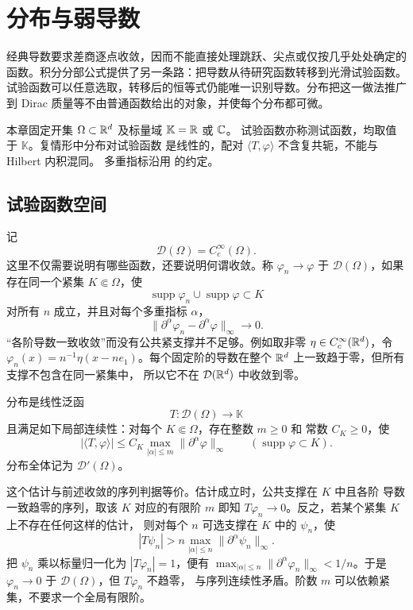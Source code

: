 \chapter{分布与弱导数}
\label{chap:distributions-weak-derivatives}

经典导数要求差商逐点收敛，因而不能直接处理跳跃、尖点或仅按几乎处处确定的
函数。积分分部公式提供了另一条路：把导数从待研究函数转移到光滑试验函数。
试验函数可以任意选取，转移后的恒等式仍能唯一识别导数。分布把这一做法推广
到 Dirac 质量等不由普通函数给出的对象，并使每个分布都可微。

本章固定开集 \(\Omega\subset\mathbb{R}^d\) 及标量域 \(\mathbb K=\mathbb{R}\) 或 \(\mathbb{C}\)。
试验函数亦称测试函数，均取值于 \(\mathbb K\)。复情形中分布对试验函数
是线性的，配对 \(\langle T,\varphi\rangle\) 不含复共轭，不能与 Hilbert 内积混同。
多重指标沿用
的约定。

\section{试验函数空间}

记
\[
 \mathcal D(\Omega)=C_c^\infty(\Omega).
\]
这里不仅需要说明有哪些函数，还要说明何谓收敛。称
\(\varphi_n\to\varphi\) 于 \(\mathcal D(\Omega)\)，如果存在同一个紧集
\(K\Subset\Omega\)，使
\[
 \operatorname{supp}\varphi_n\cup\operatorname{supp}\varphi\subset K
\]
对所有 \(n\) 成立，并且对每个多重指标 \(\alpha\)，
\[
 \|\partial^\alpha\varphi_n-\partial^\alpha\varphi\|_\infty\to0.
\]
“各阶导数一致收敛”而没有公共紧支撑并不足够。例如取非零
\(\eta\in C_c^\infty(\mathbb{R}^d)\)，令
\(\varphi_n(x)=n^{-1}\eta(x-ne_1)\)。每个固定阶的导数在整个
\(\mathbb{R}^d\) 上一致趋于零，但所有支撑不包含在同一紧集中，
所以它不在 \(\mathcal D(\mathbb{R}^d)\) 中收敛到零。

\begin{definition}
分布是线性泛函
\[
 T:\mathcal D(\Omega)\to\mathbb K
\]
且满足如下局部连续性：对每个 \(K\Subset\Omega\)，存在整数 \(m\ge0\) 和
常数 \(C_K\ge0\)，使
\begin{equation}\label{eq:distribution-local-order}
 |\langle T,\varphi\rangle|
 \le C_K\max_{|\alpha|\le m}\|\partial^\alpha\varphi\|_\infty
 \qquad(\operatorname{supp}\varphi\subset K).
\end{equation}
分布全体记为 \(\mathcal D'(\Omega)\)。
\end{definition}

这个估计与前述收敛的序列判据等价。估计成立时，公共支撑在 \(K\) 中且各阶
导数一致趋零的序列，取该 \(K\) 对应的有限阶 \(m\) 即知
\(T\varphi_n\to0\)。反之，若某个紧集 \(K\) 上不存在任何这样的估计，
则对每个 \(n\) 可选支撑在 \(K\) 中的 \(\psi_n\)，使
\[
 |T\psi_n|>n\max_{|\alpha|\le n}\|\partial^\alpha\psi_n\|_\infty.
\]
把 \(\psi_n\) 乘以标量归一化为 \(|T\varphi_n|=1\)，便有
\(\max_{|\alpha|\le n}\|\partial^\alpha\varphi_n\|_\infty<1/n\)。于是
\(\varphi_n\to0\) 于 \(\mathcal D(\Omega)\)，但 \(T\varphi_n\) 不趋零，
与序列连续性矛盾。阶数 \(m\) 可以依赖紧集，不要求一个全局有限阶。

